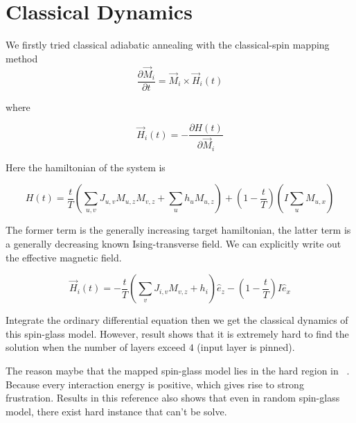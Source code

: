 \documentclass[twocolumn,superscriptaddress,english,showpacs,longbibliography]{revtex4-2}
\begin{document}
\section{Classical Dynamics}\label{classical-dynamics-1}
We firstly tried classical adiabatic annealing with the classical-spin
mapping method~\cite{Wang2013}
\begin{equation}
\frac{\partial \vec M_i}{\partial t} = \vec M_{i} \times \vec H_{i}(t)
\end{equation}

where

\begin{equation}
\vec H_i(t) = -\frac{\partial H(t)}{\partial \vec M_i} 
\end{equation}

Here the hamiltonian of the system is

\begin{equation}
H(t) = \frac{t}{T}(\sum_{u,v}J_{u,v} M_{u,z}M_{v,z} + \sum_{u} h_u M_{u, z}) + (1-\frac{t}{T})(I\sum_{u}M_{u,x})
\end{equation}

The former term is the generally increasing target hamiltonian, the
latter term is a generally decreasing known Ising-transverse field. We
can explicitly write out the effective magnetic field.

\[
\vec H_{i}(t) = -\frac{t}{T}(\sum_{v}J_{i, v}M_{v,z} + h_i)\hat e_z - (1-\frac{t}{T})I\hat e_x
\]

Integrate the ordinary differential equation then we get the classical
dynamics of this spin-glass model. However, result shows that it is
extremely hard to find the solution when the number of layers exceed
$4$ (input layer is pinned).

The reason maybe that the mapped spin-glass model lies in the hard
region in ~\cite{Wang2013}. Because every interaction energy is positive, which
gives rise to strong frustration. Results in this reference also shows that even in
random spin-glass model, there exist hard instance that can't be solve.
\end{document}
